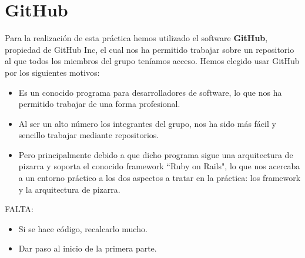 \section*{GitHub}
Para la realización de esta práctica hemos utilizado el software \textbf{GitHub}, propiedad de 	{GitHub Inc}, el cual nos ha permitido trabajar sobre un repositorio al que todos los miembros del grupo teníamos acceso. Hemos elegido usar GitHub por los siguientes motivos:
\begin{itemize}
	\item Es un conocido programa para desarrolladores de software, lo que nos ha permitido trabajar de una forma profesional.
	\item Al ser un alto número los integrantes del grupo, nos ha sido más fácil y sencillo trabajar mediante repositorios. 
	\item Pero principalmente debido a que dicho programa sigue una arquitectura de pizarra y soporta el conocido framework ``Ruby on Rails", lo que nos acercaba a un entorno práctico a los dos aspectos a tratar en la práctica: los framework y la arquitectura de pizarra.
\end{itemize}

\color{red}
FALTA:
\begin{itemize}
\item Si se hace código, recalcarlo mucho.
\item Dar paso al inicio de la primera parte.
\end{itemize}
\color{black}

